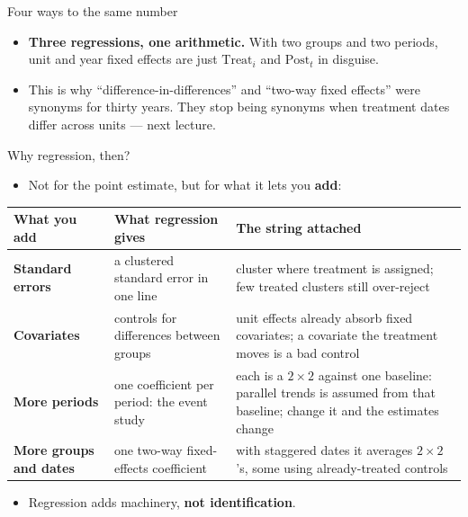 \documentclass[
  11pt,
  ignorenonframetext,
  aspectratio=169,
]{beamer}
\providecommand{\tightlist}{%
  \setlength{\itemsep}{0pt}\setlength{\parskip}{0pt}}
\begin{document}
\begin{frame}[fragile]{Four ways to the same number}
\begin{itemize}
\tightlist
\item
  \textbf{Three regressions, one arithmetic.} With two groups and two
  periods, unit and year fixed effects are just \(\text{Treat}_i\) and
  \(\text{Post}_t\) in disguise.
\item
  This is why ``difference-in-differences'' and ``two-way fixed
  effects'' were synonyms for thirty years. They stop being synonyms
  when treatment dates differ across units --- next lecture.
\end{itemize}
\end{frame}

\begin{frame}{Why regression, then?}
\protect{}\label{why-regression-then}
\begin{itemize}
\tightlist
\item
  Not for the point estimate, but for what it lets you \textbf{add}:
\end{itemize}

\begin{center}\footnotesize
\begin{tabular}{R{2.5cm}R{3.7cm}R{6.3cm}}
\toprule
What you add & What regression gives & The string attached \\
\midrule
\textbf{Standard errors} & a clustered standard error in one line & cluster where treatment is assigned; few treated clusters still over-reject \\
\addlinespace
\textbf{Covariates} & controls for differences between groups & unit effects already absorb fixed covariates; a covariate the treatment moves is a bad control \\
\addlinespace
\textbf{More periods} & one coefficient per period: the event study & each is a $2 \times 2$ against one baseline: parallel trends is assumed from that baseline; change it and the estimates change \\
\addlinespace
\textbf{More groups and dates} & one two-way fixed-effects coefficient & with staggered dates it averages $2 \times 2$'s, some using already-treated controls \\
\bottomrule
\end{tabular}
\end{center}

\begin{itemize}
\tightlist
\item
  Regression adds machinery, \textbf{not identification}.
\end{itemize}
\end{frame}
\end{document}
